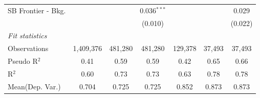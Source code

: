 \begin{tabular}{lcccccc}
   SB Frontier - Bkg.             &                &                & 0.036$^{***}$  &                &                & 0.029\\   
                                  &                &                & (0.010)        &                &                & (0.022)\\   
   \midrule
   \emph{Fit statistics}\\
   Observations                   & 1,409,376      & 481,280        & 481,280        & 129,378        & 37,493         & 37,493\\  
   Pseudo R$^2$                   & 0.41           & 0.59           & 0.59           & 0.42           & 0.65           & 0.66\\  
   R$^2$                          & 0.60           & 0.73           & 0.73           & 0.63           & 0.78           & 0.78\\  
Mean(Dep. Var.) & 0.704 & 0.725 & 0.725 & 0.852 & 0.873 & 0.873 \\
   

\end{tabular}
